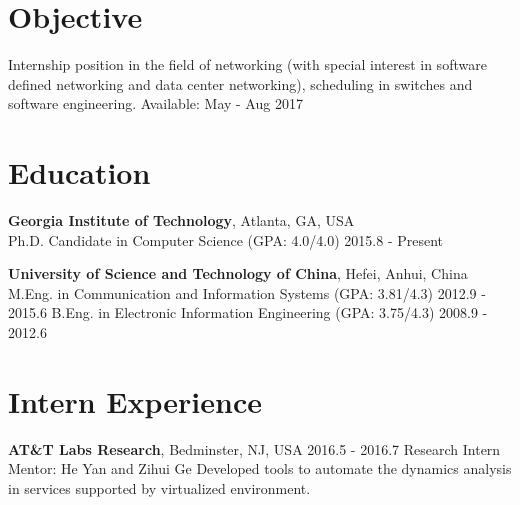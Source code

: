 \documentclass[line,11pt,letter]{/Users/longgong/Dropbox/git-reps/easy_cv/includes/cls/myRes}
\begin{document}

\address{266 Ferst Dr, Atlanta, GA 30332, United States}
\address{Cell: +1(404)697-0608. \hspace{5pt} Email: gonglong@gatech.}
\begin{resume}


\vspace*{-10pt}
\vspace*{-15pt}
\section{Objective}
\vspace{-4pt}
{\setlength{\parskip}{0pt}
 {Internship position in the field of networking (with special interest in software defined networking and data center networking), scheduling in switches and software engineering. \hfill{Available: May - Aug 2017}\break}
}%
\negspace
\section{Education}
\vspace{-4pt}
{\setlength{\parskip}{0pt}
\textbf{Georgia Institute of Technology}, Atlanta, GA, USA\\
{\hspace*{1em} Ph.D. Candidate in Computer Science (GPA: 4.0/4.0) \hspace{52.5pt} \hfill 2015.8 - Present\break}
}
\sspace

{\setlength{\parskip}{0pt}
\textbf{University of Science and Technology of China}, Hefei, Anhui, China\\
{\hspace*{1em} M.Eng. in Communication and Information Systems (GPA: 3.81/4.3) \hspace{52.5pt} \hfill 2012.9 - 2015.6\break}
{\hspace*{1em} B.Eng. in Electronic Information Engineering (GPA: 3.75/4.3) \hspace{52.5pt} \hfill 2008.9 - 2012.6\break}
}
\negspace
\section{Intern Experience}
\vspace{-4pt}
{\setlength{\parskip}{0pt}
{\bf AT\&T Labs Research}, Bedminster, NJ, USA \hfill 2016.5 - 2016.7\break
{\hspace*{1em} Research Intern \hfill Mentor: He Yan and Zihui Ge\break}
{\hspace*{1em} Developed tools to automate the dynamics analysis in services supported by virtualized environment.\break}
}\negspace

\end{resume}
\end{document}
